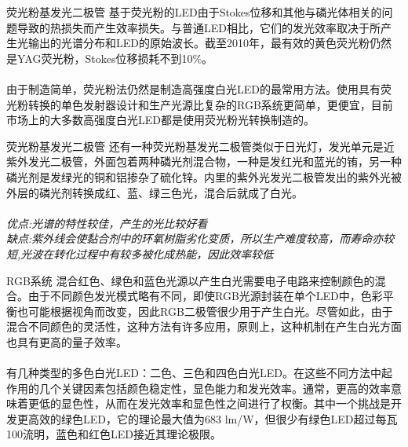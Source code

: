 \begin{slide}{荧光粉基发光二极管}
    基于荧光粉的LED由于Stokes位移和其他与磷光体相关的问题导致的热损失而产生效率损失。与普通LED相比，它们的发光效率取决于所产生光输出的光谱分布和LED的原始波长。截至2010年，最有效的黄色荧光粉仍然是YAG荧光粉，Stokes位移损耗不到10\%。
    \\~\\
    由于制造简单，荧光粉法仍然是制造高强度白光LED的最常用方法。使用具有荧光粉转换的单色发射器设计和生产光源比复杂的RGB系统更简单，更便宜，目前市场上的大多数高强度白光LED都是使用荧光粉光转换制造的。
\end{slide}

\begin{slide}{荧光粉基发光二极管}
    还有一种荧光粉基发光二极管类似于日光灯，发光单元是近紫外发光二极管，外面包着两种磷光剂混合物，一种是发红光和蓝光的铕，另一种磷光剂是发绿光的铜和铝掺杂了硫化锌。内里的紫外光发光二极管发出的紫外光被外层的磷光剂转换成红、蓝、绿三色光，混合后就成了白光。
    \\~\\
    \textit{优点:光谱的特性较佳，产生的光比较好看}\\
    \textit{缺点:紫外线会使黏合剂中的环氧树脂劣化变质，所以生产难度较高，而寿命亦较短,光波在转化过程中有较多被化成热能，因此效率较低}
\end{slide}

\begin{slide}{RGB系统}
    混合红色、绿色和蓝色光源以产生白光需要电子电路来控制颜色的混合。由于不同颜色发光模式略有不同，即使RGB光源封装在单个LED中，色彩平衡也可能根据视角而改变，因此RGB二极管很少用于产生白光。尽管如此，由于混合不同颜色的灵活性，这种方法有许多应用，原则上，这种机制在产生白光方面也具有更高的量子效率。
    \\~\\
    有几种类型的多色白光LED：二色、三色和四色白光LED。在这些不同方法中起作用的几个关键因素包括颜色稳定性，显色能力和发光效率。通常，更高的效率意味着更低的显色性，从而在发光效率和显色性之间进行了权衡。其中一个挑战是开发更高效的绿色LED，它的理论最大值为683 lm/W，但很少有绿色LED超过每瓦100流明，蓝色和红色LED接近其理论极限。
\end{slide}

